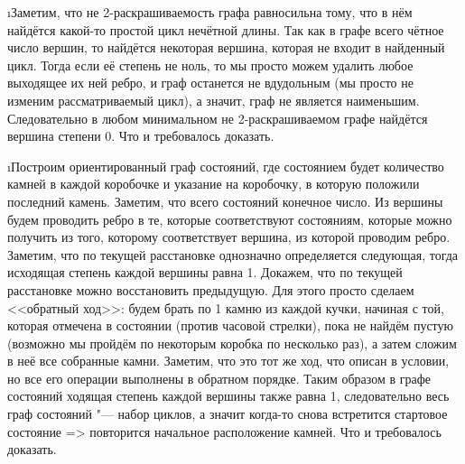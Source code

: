 \i Заметим, что не 2-раскрашиваемость графа равносильна тому, что в нём найдётся какой-то простой цикл нечётной длины. Так как в графе всего чётное число вершин, то найдётся некоторая вершина, которая не входит в найденный цикл. Тогда если её степень не ноль, то мы просто можем удалить любое выходящее их ней ребро, и граф останется не вдудольным (мы просто не изменим рассматриваемый цикл), а значит, граф не является наименьшим. Следовательно в любом минимальном не 2-раскрашиваемом графе найдётся вершина степени 0. Что и требовалось доказать.

\i Построим ориентированный граф состояний, где состоянием будет количество камней в каждой коробочке и указание на коробочку, в которую положили последний камень. Заметим, что всего состояний конечное число. Из вершины будем проводить ребро в те, которые соответствуют состояниям, которые можно получить из того, которому соответствует вершина, из которой проводим ребро. Заметим, что по текущей расстановке однозначно определяется следующая, тогда исходящая степень каждой вершины равна 1. Докажем, что по текущей расстановке можно восстановить предыдущую. Для этого просто сделаем <<обратный ход>>: будем брать по 1 камню из каждой кучки, начиная с той, которая отмечена в состоянии (против часовой стрелки), пока не найдём пустую (возможно мы пройдём по некоторым коробка по несколько раз), а затем сложим в неё все собранные камни. Заметим, что это тот же ход, что описан в условии, но все его операции выполнены в обратном порядке. Таким образом в графе состояний ходящая степень каждой вершины также равна 1, следовательно весь граф состояний "--- набор циклов, а значит когда-то снова встретится стартовое состояние => повторится начальное расположение камней. Что и требовалось доказать.